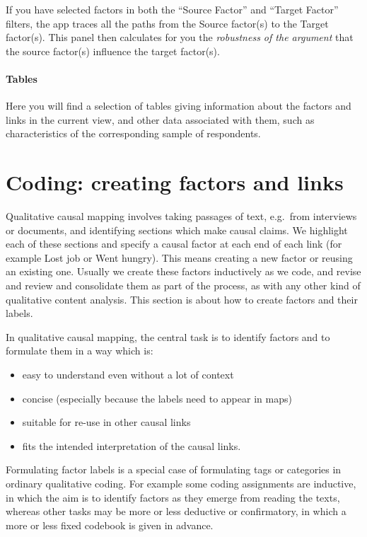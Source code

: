 \documentclass[
]{book}
\begin{document}
If you have selected factors in both the ``Source Factor'' and ``Target Factor'' filters, the app traces all the paths from the Source factor(s) to the Target factor(s). This panel then calculates for you the \emph{robustness of the argument} that the source factor(s) influence the target factor(s).

\hypertarget{tables-1}{%
\subsubsection{Tables}\label{tables-1}}

Here you will find a selection of tables giving information about the factors and links in the current view, and other data associated with them, such as characteristics of the corresponding sample of respondents.

\hypertarget{creating}{%
\chapter{Coding: creating factors and links}\label{creating}}

Qualitative causal mapping involves taking passages of text, e.g.~from interviews or documents, and identifying sections which make causal claims. We highlight each of these sections and specify a causal factor at each end of each link (for example Lost job or Went hungry). This means creating a new factor or reusing an existing one. Usually we create these factors inductively as we code, and revise and review and consolidate them as part of the process, as with any other kind of qualitative content analysis. This section is about how to create factors and their labels.

In qualitative causal mapping, the central task is to identify factors and to formulate them in a way which is:

\begin{itemize}
\item
  easy to understand even without a lot of context
\item
  concise (especially because the labels need to appear in maps)
\item
  suitable for re-use in other causal links
\item
  fits the intended interpretation of the causal links.
\end{itemize}

Formulating factor labels is a special case of formulating tags or categories in ordinary qualitative coding. For example some coding assignments are inductive, in which the aim is to identify factors as they emerge from reading the texts, whereas other tasks may be more or less deductive or confirmatory, in which a more or less fixed codebook is given in advance.
\end{document}
